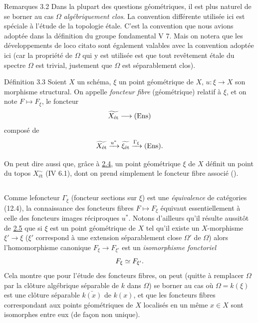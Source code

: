 \documentclass[10pt]{../fichiers-configuration-latex/smfart}
\begin{document}
\begin{enonce*}[remark]{Remarques 3.2}
Dans la plupart des questions géométriques, il est plus naturel de
se borner au cas $\Omega$ \emph{algébriquement clos}. La convention
différente utilisée ici est spéciale à l'étude de la topologie
étale. C'est la convention que nous avions adoptée dans la
définition du groupe fondamental  V 7. Mais on notera que les
développements de loco citato sont également valables avec la
convention adoptée ici (car la propriété de $\Omega$ qui y est
utilisée est que tout revêtement étale du spectre $\Omega$ est
trivial, \ie justement que $\Omega$ est séparablement clos).
\end{enonce*}

\begin{enonce*}{Définition 3.3}
Soient $X$ un schéma, $\xi$ un point géométrique de $X$, $u : \xi \to
X$ son morphisme structural. On appelle \emph{foncteur fibre} (géométrique)
relatif à $\xi$, et on note $F \mapsto F_{\xi}$, le foncteur
$$
\widetilde{X_{\text{\rm ét}}} \to (\Ens)
$$
composé de
$$
\widetilde{X_{\text{\rm ét}}} \xrightarrow{u^{\ast}}
\widetilde{\xi_{\text{\rm ét}}} \xrightarrow{\Gamma_{\xi}} (\operatorname{Ens}){}.
$$
\end{enonce*}

On peut dire aussi que, grâce à \hyperref[VIII.cor2.4]{2.4},
un point géométrique $\xi$ de $X$
définit un point du topos $X^{\sim}_{\text{ét}}$ (IV 6.1),
dont on prend  simplement le foncteur fibre associé (\loccit).

\setcounter{subsection}{3}
\subsection{}

Comme le\pageoriginale  foncteur $\Gamma_{\xi}$ (foncteur sections
sur $\xi$) est une \emph{équivalence} de catégories (12.4), la
connaissance des foncteurs fibres $F \mapsto F_{\xi}$ équivaut
essentiellement à celle des foncteurs images réciproques $u^{\ast}$.
Notons d'ailleurs qu'il résulte aussitôt de \hyperref[VIII.cor2.5]{2.5} que si
$\xi$ est un point géométrique de $X$ tel qu'il existe un
$X$-morphisme $\xi'\to \xi$ (\ie $\xi'$ correspond à une extension
séparablement close $\Omega'$ de $\Omega$) alors l'homomorphisme
canonique $F_{\xi} \to F_{\xi'}$ est un \emph{isomorphisme
fonctoriel}
$$
F_{\xi} \simeq F_{\xi'}{}.
$$
Cela montre que pour l'étude des foncteurs fibres, on peut (quitte à
remplacer $\Omega$ par la clôture algébrique séparable de $k$ dans
$\Omega$) se borner au cas où $\Omega = k(\xi)$ est une clôture
séparable $\bar{k(x)}$ de $k(x)$, et que les foncteurs fibres
correspondant aux points géométriques de $X$ localisés en
un même $x
\in X$ sont isomorphes entre eux (de façon non unique).
\end{document}
